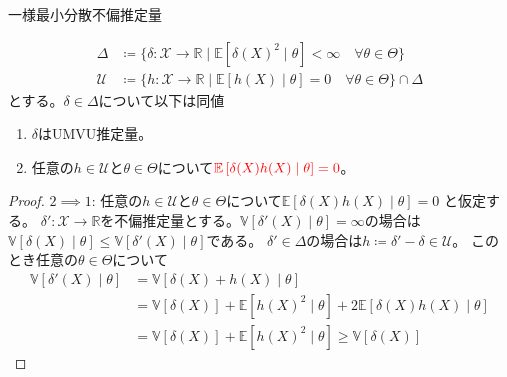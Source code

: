 \documentclass[lualatex,handout]{beamer}
\newcommand{\mycolor}[2]{%
  \begingroup
  \colorlet{currentcolor}{.}%
  \color{#1}#2%
  \color{currentcolor}%
  \endgroup
}
\newcommand{\emm}[1]{\mycolor{red}{#1}}
\newcommand{\expt}[1]{\mathbb{E}\left[#1\right]}
\newcommand{\var}[1]{\mathbb{V}\left[#1\right]}
\theoremstyle{definition}
\begin{document}
\begin{frame}{一様最小分散不偏推定量}
\small
\begin{theorem}

\vspace{-2em}
\begin{align*}
\Delta&\coloneq\{\delta\colon\mathcal{X}\to\mathbb{R}\mid \expt{\delta(X)^2\mid\theta}<\infty \quad\forall\theta\in\Theta\}\\
\mathcal{U}&\coloneq\{h\colon\mathcal{X}\to\mathbb{R}\mid \expt{h(X)\mid\theta}=0 \quad\forall\theta\in\Theta\} \cap\Delta
\end{align*}
とする。$\delta\in\Delta$について以下は同値
\begin{enumerate}
\item $\delta$はUMVU推定量。
\item 任意の$h\in\mathcal{U}$と$\theta\in\Theta$について$\emm{\expt{\delta(X)h(X)\mid\theta}=0}$。
\end{enumerate}
\end{theorem}
\begin{proof}
$2\implies 1$:
任意の$h\in\mathcal{U}$と$\theta\in\Theta$について$\expt{\delta(X)h(X)\mid\theta}=0$ と仮定する。
$\delta'\colon\mathcal{X}\to\mathbb{R}$を不偏推定量とする。$\var{\delta'(X)\mid\theta}=\infty$の場合は
$\var{\delta(X)\mid\theta}\le\var{\delta'(X)\mid\theta}$である。
$\delta'\in\Delta$の場合は$h\coloneq\delta'-\delta\in\mathcal{U}$。
このとき任意の$\theta\in\Theta$について
\begin{align*}
\var{\delta'(X)\mid\theta} &= \var{\delta(X)+h(X)\mid\theta}\\
&= \var{\delta(X)}+\expt{h(X)^2\mid\theta} + 2\expt{\delta(X)h(X)\mid\theta}\\
&= \var{\delta(X)}+\expt{h(X)^2\mid\theta} \ge \var{\delta(X)}
\end{align*}
\end{proof}
\end{frame}
\end{document}
